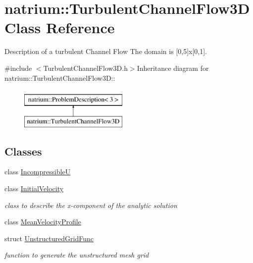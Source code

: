 \hypertarget{classnatrium_1_1TurbulentChannelFlow3D}{
\section{natrium::TurbulentChannelFlow3D Class Reference}
\label{classnatrium_1_1TurbulentChannelFlow3D}
}


Description of a turbulent Channel Flow The domain is \mbox{[}0,5\mbox{]}x\mbox{[}0,1\mbox{]}.  


{\ttfamily \#include $<$TurbulentChannelFlow3D.h$>$}Inheritance diagram for natrium::TurbulentChannelFlow3D::\begin{figure}[H]
\begin{center}
\leavevmode
\includegraphics[height=2cm]{classnatrium_1_1TurbulentChannelFlow3D}
\end{center}
\end{figure}
\subsection*{Classes}
\begin{DoxyCompactItemize}
\item 
class \hyperlink{classnatrium_1_1TurbulentChannelFlow3D_1_1IncompressibleU}{IncompressibleU}
\item 
class \hyperlink{classnatrium_1_1TurbulentChannelFlow3D_1_1InitialVelocity}{InitialVelocity}
\begin{DoxyCompactList}\small\item\em class to describe the x-\/component of the analytic solution \item\end{DoxyCompactList}\item 
class \hyperlink{classnatrium_1_1TurbulentChannelFlow3D_1_1MeanVelocityProfile}{MeanVelocityProfile}
\item 
struct \hyperlink{structnatrium_1_1TurbulentChannelFlow3D_1_1UnstructuredGridFunc}{UnstructuredGridFunc}
\begin{DoxyCompactList}\small\item\em function to generate the unstructured mesh grid \item\end{DoxyCompactList}\end{DoxyCompactItemize}
